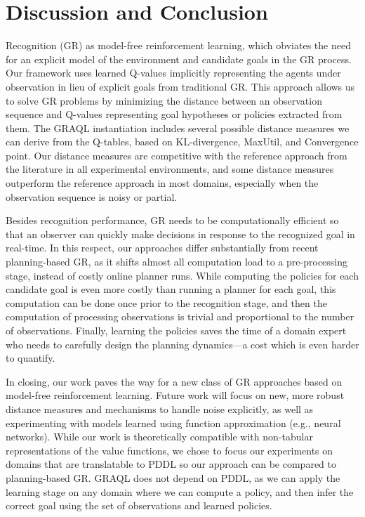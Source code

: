\documentclass[letterpaper]{article}
\begin{document}
\section*{Discussion and Conclusion}
\label{sec:discussion}
 Recognition (GR) as model-free reinforcement learning, which obviates the need for an explicit model of the environment and candidate goals in the GR process.
Our framework uses learned Q-values implicitly representing the agents under observation in lieu of explicit goals from traditional GR.
This approach allows us to solve GR problems by minimizing the distance between an
observation sequence and Q-values representing goal hypotheses or policies extracted from them.
%
The GRAQL instantiation includes several possible distance measures we can derive from the Q-tables, based on KL-divergence, MaxUtil, and Convergence point. %
Our distance measures are competitive with the reference approach from the literature \cite{ramirez2009plan} in all experimental environments, and some distance measures outperform the reference approach in most domains, especially when the observation sequence is noisy or partial.
%

Besides recognition performance, GR needs to be computationally efficient so that an observer can quickly make decisions in response to the recognized goal in real-time.
In this respect, our approaches differ substantially from recent planning-based GR, as it shifts almost all computation load to a pre-processing stage, instead of costly online planner runs.
While computing the policies for each candidate goal is even more costly than running a planner for each goal, this computation can be done once prior to the recognition stage, and then the computation of processing observations is trivial and proportional to the number of observations.
Finally, learning the policies saves the time of a domain expert who needs to carefully design the planning dynamics---a cost which is even harder to quantify.

In closing, our work paves the way for a new class of GR approaches based on model-free reinforcement learning.
Future work will focus on new, more robust distance measures and mechanisms to handle noise explicitly, as well as experimenting with models learned using function approximation (e.g., neural networks).
While our work is theoretically compatible with non-tabular representations of the value functions, we chose to focus our experiments on domains that are translatable to PDDL so our approach can be compared to planning-based GR.
%
GRAQL does not depend on PDDL, as we can apply the learning stage on any domain where we can compute a policy, and then infer the correct goal using the set of observations and learned policies.
%
%
%
%
\end{document}
